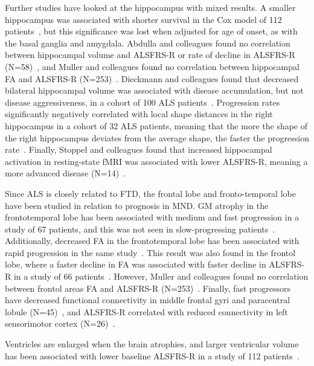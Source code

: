 Further studies have looked at the hippocampus with mixed results.
A smaller hippocampus was associated with shorter survival in the Cox model of 112 patients~\cite{westenengSubcorticalStructuresAmyotrophic2015}, but this significance was lost when adjusted for age of onset, as with the basal ganglia and amygdala.
Abdulla and colleagues found no correlation between hippocampal volume and ALSFRS-R or rate of decline in ALSFRS-R (N=58)~\cite{abdullaHippocampalDegenerationPatients2014}, and Muller and colleagues found no correlation between hippocampal FA and ALSFRS-R (N=253)~\cite{mullerLargescaleMulticentreCerebral2016}.
Dieckmann and colleagues found that decreased bilateral hippocampal volume was associated with disease accumulation, but not disease aggressiveness, in a cohort of 100 ALS patients~\cite{dieckmannCorticalSubcorticalGrey2022}.
Progression rates significantly negatively correlated with local shape distances in the right hippocampus in a cohort of 32 ALS patients, meaning that the more the shape of the right hippocampus deviates from the average shape, the faster the progression rate~\cite{taeShapeAnalysisSubcortical2020}.
Finally, Stoppel and colleagues found that increased hippocampal activation in resting-state fMRI was associated with lower ALSFRS-R, meaning a more advanced disease (N=14)~\cite{stoppelStructuralFunctionalHallmarks2014}.

Since ALS is closely related to FTD, the frontal lobe and fronto-temporal lobe have been studied in relation to prognosis in MND.
GM atrophy in the frontotemporal lobe has been associated with medium and fast progression in a study of 67 patients, and this was not seen in slow-progressing patients~\cite{sendaStructuralMRICorrelates2017}.
Additionally, decreased FA in the frontotemporal lobe has been associated with rapid progression in the same study~\cite{sendaStructuralMRICorrelates2017}.
This result was also found in the frontol lobe, where a faster decline in FA was associated with faster decline in ALSFRS-R in a study of 66 patients~\cite{kalraProspectiveHarmonizedMulticenter2020}.
However, Muller and colleagues found no correlation between frontol areas FA and ALSFRS-R (N=253)~\cite{mullerLargescaleMulticentreCerebral2016}.
Finally, fast progressors have decreased functional connectivity in middle frontal gyri and paracentral lobule (N=45)~\cite{trojsiRestingStateFunctional2021}, and ALSFRS-R correlated with reduced connectivity in left sensorimotor cortex (N=26)~\cite{agostaSensorimotorFunctionalConnectivity2011}.

Ventricles are enlarged when the brain atrophies, and larger ventricular volume has been associated with lower baseline ALSFRS-R in a study of 112 patients~\cite{westenengSubcorticalStructuresAmyotrophic2015}.

